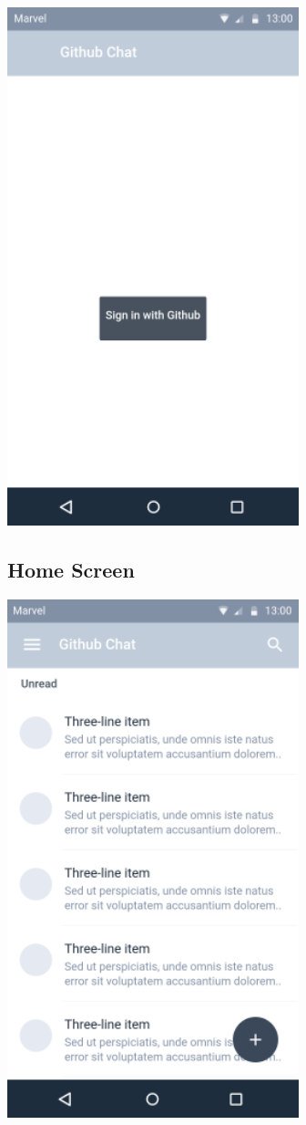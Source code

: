\documentclass{report}
\begin{document}
\begin{center}
    \includegraphics[scale=0.6]{design-login}
\end{center}

\newpage
\subsection{Home Screen}

\begin{center}
    \includegraphics[scale=0.6]{design-home}
\end{center}
\end{document}
